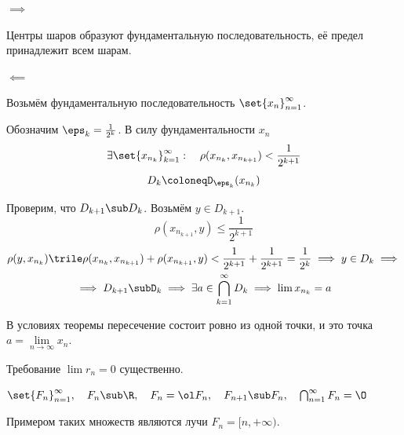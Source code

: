 \begin{iproof}
\item $ \implies $

	Центры шаров образуют фундаментальную последовательность, её предел принадлежит всем шарам.
\item $ \impliedby $

	Возьмём фундаментальную последовательность $ \set{x_n}_{n = 1}^\infty $.

	Обозначим $ \eps_k = \frac1{2^k} $.
	В силу фундаментальности $ x_n $
	$$ \exists \set{x_{n_k}}_{k = 1}^\infty : \quad \rho(x_{n_k}, x_{n_{k + 1}}) < \frac1{2^{k + 1}} $$
	$$ D_k \coloneq \mathtt D_{\eps_k} (x_{n_k}) $$

	Проверим, что $ D_{k + 1} \sub D_k $.
	Возьмём $ y \in D_{k + 1} $.
	$$ \rho(x_{n_{k + 1}}, y) \le \frac1{2^{k + 1}} $$
	\begin{multline*}
		\rho(y, x_{n_k}) \trile \rho(x_{n_k}, x_{n_{k + 1}}) + \rho(x_{n_{k + 1}}, y)
		< \frac1{2^{k + 1}} + \frac1{2^{k + 1}} = \frac1{2^k} \implies y \in D_k \implies \\
		\implies D_{k + 1} \sub \mathtt D_k \implies
		\exists a \in \bigcap_{k = 1}^\infty D_k \implies \lim x_{n_k} = a
	\end{multline*}
\end{iproof}

\begin{remark}
	В условиях теоремы пересечение состоит ровно из одной точки, и это точка $ a = \lim\limits_{n \to \infty} x_n $.
\end{remark}

\begin{remark}
	Требование $ \lim r_n = 0 $ существенно.
\end{remark}

\begin{eg}[подготовительный]
	$ \set{F_n}_{n = 1}^\infty, \quad F_n \sub \R, \quad F_n = \ol F_n, \quad F_{n + 1} \sub F_n,
	\quad \bigcap_{n = 1}^\infty F_n = \O $

	Примером таких множеств являются лучи $ F_n = [n, +\infty) $.
\end{eg}


